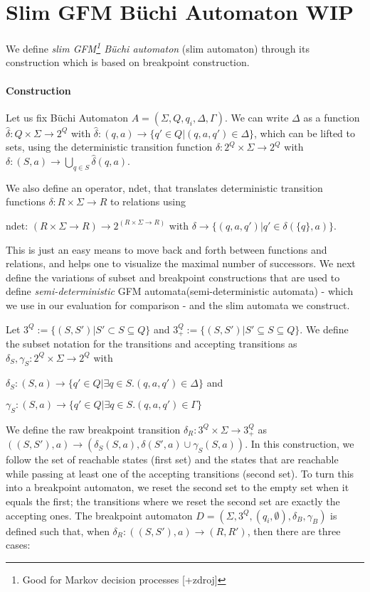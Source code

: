 \documentclass[
	digital
nolof, nolot
]{fithesis3}
\begin{document}
		\section{Slim GFM Büchi Automaton WIP}
			We define \emph{slim GFM\footnote{Good for Markov decision processes [+zdroj]} Büchi automaton} (slim automaton) through its construction which is based on breakpoint construction. 
			\paragraph{Construction}
			Let us fix Büchi Automaton $A=(\Sigma, Q, q_i, \Delta, \Gamma)$. We can write $\Delta$ as a function $\hat{\delta}: Q \times \Sigma \rightarrow 2^Q$ with
			$\hat{\delta}: (q, a) \rightarrow \{q' \in Q | (q, a, q') \in \Delta\}$,
			which can be lifted to sets, using the deterministic transition function $\delta: 2^Q \times \Sigma \rightarrow 2^Q$ with
			$\delta: (S, a) \rightarrow
			\bigcup_{q\in S} \hat{\delta}(q,a)$.
			
			We also define an operator, ndet, that translates deterministic transition functions
			$\delta: R \times \Sigma \rightarrow R$ to relations using
			
			ndet: $(R \times \Sigma \rightarrow R) \rightarrow 2^{(R \times \Sigma \rightarrow R)}$
			with
			$\delta \rightarrow \{(q,a,q')|q' \in \delta(\{q\},a)\}$.
			
			This is just an easy means to move back and forth between functions and relations,
			and helps one to visualize the maximal number of successors. We next define the variations of subset and breakpoint constructions that are used to define  \emph{semi-deterministic} GFM automata(semi-deterministic automata) - which we use in our evaluation for comparison - and the slim automata we construct.
			
			Let $3^Q :=\{(S,S')|S'\subset S \subseteq Q\}$ and
			$3^Q_+:=\{(S,S')|S'\subseteq S \subseteq Q\}$.
			We define the subset notation for the transitions and accepting transitions as $\delta_S,\gamma_S:2^Q \times \Sigma \rightarrow 2^Q$ with
			
			$\delta_S: (S,a)\rightarrow\{q'\in Q | \exists q \in S.(q,a,q') \in \Delta\}$ and
			
			$\gamma_S: (S,a)\rightarrow\{q'\in Q | \exists q \in S.(q,a,q') \in \Gamma\}$
			
			We define the raw breakpoint transition
			$\delta_R:3^Q \times \Sigma \rightarrow 3^Q_+$ as
			$((S, S'), a) \rightarrow(\delta_S(S, a), \delta(S',a)\cup \gamma_S(S, a))$.
			In this construction, we follow the set of reachable states (first set) and the states that are reachable while passing at least one of the accepting transitions (second set). To turn this into a breakpoint automaton, we reset the second set to the empty set when it equals the first; the transitions where we reset the second set are exactly the accepting ones. The breakpoint automaton $D = (\Sigma, 3^Q, (q_i, \emptyset), \delta_B, \gamma_B)$ is defined such that, when $\delta_R: ((S, S'), a) \rightarrow (R, R')$, then there are three cases:
			
\end{document}
